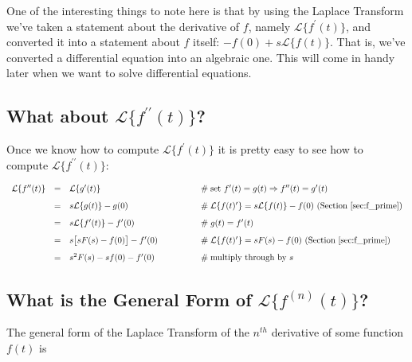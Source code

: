 \documentclass{article}
\theoremstyle{definition}
\begin{document}
\bigskip
\noindent
One of the interesting things to note here is that by using the Laplace Transform we've taken a statement about the derivative of $f$, namely $\mathcal{L}\{f^\prime(t)\}$,
and converted it into a statement about $f$ itself: $ -f(0) + s \mathcal{L}\{f(t)\} $. That is, we've converted a differential equation into an algebraic one. This will come in handy later 
when we want to solve differential equations.

\newpage
\subsection{What about $\mathcal{L}\{f^{\prime\prime}(t)\}$?}

\bigskip
\noindent
Once we know how to compute $\mathcal{L}\{f^{\prime}(t)\}$ it is pretty easy to see how to compute $\mathcal{L}\{f^{\prime\prime}(t)\}$:

\begin{equation*}
\begin{array}{lllll}
\mathcal{L}\{f^{\prime \prime}(t)\}           
&=&  \mathcal{L}\{g^\prime (t)\}                                 &\qquad \qquad \mathrel{\#} \text{set $f^\prime(t) = g(t) \Rightarrow f^{\prime \prime}(t) = g^\prime(t)$}                     \\   
[8pt]
&=& s \mathcal{L}\{g(t)\}  - g(0)                                 &\qquad  \qquad \mathrel{\#} \mathcal{L}\{f(t)^\prime\} = s \mathcal{L}\{f(t)\}  -f(0) \text{ (Section \ref{sec:f_prime})}  \\   
[8pt]
&=& s \mathcal{L}\{f^\prime(t)\} - f^\prime(0)             &\qquad \qquad \mathrel{\#} g(t) = f^\prime(t)                                                                                                              \\
[8pt] 
&=& s \big [ sF(s) - f(0) \big ] - f^\prime(0)                 &\qquad \qquad \mathrel{\#} \mathcal{L}\{f(t)^\prime\} = s F(s) -f(0) \text{ (Section \ref{sec:f_prime})}                        \\  
[8pt]
&=& s^2F(s) - sf(0) - f^\prime(0)                                &\qquad \qquad \mathrel{\#} \text{multiply through by $s$}
\end{array}
\end{equation*}

\smallskip
\subsection{What is the General Form of $\mathcal{L}\{f^{(n)}(t)\}$?}
\bigskip
\noindent
The general form of the Laplace Transform of the $n^{th}$ derivative of some function $f(t)$ is 
\end{document}
